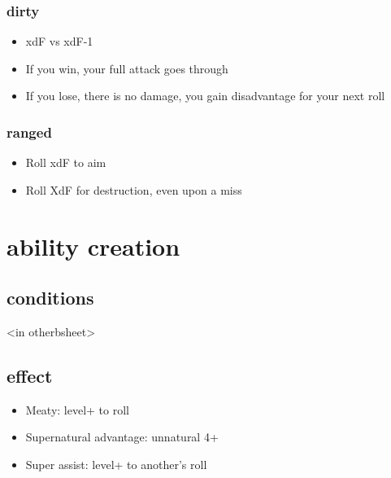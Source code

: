 \documentclass[10pt,letterpaper]{article}
\begin{document}
\subsubsection{dirty}
\begin{itemize}
  \item  xdF vs xdF-1
  \item  If you win, your full attack goes through
  \item  If you lose, there is no damage, you gain disadvantage for your next roll
\end{itemize}
\subsubsection{ranged}
\begin{itemize}
  \item  Roll xdF to aim
  \item  Roll XdF for destruction, even upon a miss
\end{itemize}
\section{ability creation}
\subsection{conditions}
<in otherbsheet>


\subsection{effect}
\begin{itemize}
  \item  Meaty: level+ to roll
  \item  Supernatural advantage: unnatural 4+
  \item  Super assist: level+ to another's roll
\end{itemize}

	
	
\end{document}

